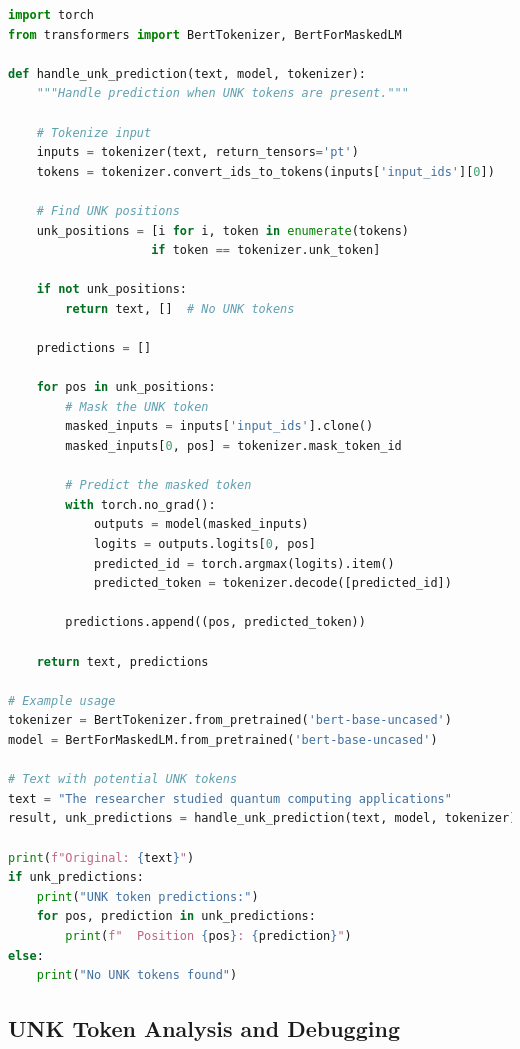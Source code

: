 \begin{example}
\begin{lstlisting}[language=Python]
import torch
from transformers import BertTokenizer, BertForMaskedLM

def handle_unk_prediction(text, model, tokenizer):
    """Handle prediction when UNK tokens are present."""
    
    # Tokenize input
    inputs = tokenizer(text, return_tensors='pt')
    tokens = tokenizer.convert_ids_to_tokens(inputs['input_ids'][0])
    
    # Find UNK positions
    unk_positions = [i for i, token in enumerate(tokens) 
                    if token == tokenizer.unk_token]
    
    if not unk_positions:
        return text, []  # No UNK tokens
    
    predictions = []
    
    for pos in unk_positions:
        # Mask the UNK token
        masked_inputs = inputs['input_ids'].clone()
        masked_inputs[0, pos] = tokenizer.mask_token_id
        
        # Predict the masked token
        with torch.no_grad():
            outputs = model(masked_inputs)
            logits = outputs.logits[0, pos]
            predicted_id = torch.argmax(logits).item()
            predicted_token = tokenizer.decode([predicted_id])
            
        predictions.append((pos, predicted_token))
    
    return text, predictions

# Example usage
tokenizer = BertTokenizer.from_pretrained('bert-base-uncased')
model = BertForMaskedLM.from_pretrained('bert-base-uncased')

# Text with potential UNK tokens
text = "The researcher studied quantum computing applications"
result, unk_predictions = handle_unk_prediction(text, model, tokenizer)

print(f"Original: {text}")
if unk_predictions:
    print("UNK token predictions:")
    for pos, prediction in unk_predictions:
        print(f"  Position {pos}: {prediction}")
else:
    print("No UNK tokens found")
\end{lstlisting}
\end{example}

\subsection{UNK Token Analysis and Debugging}

